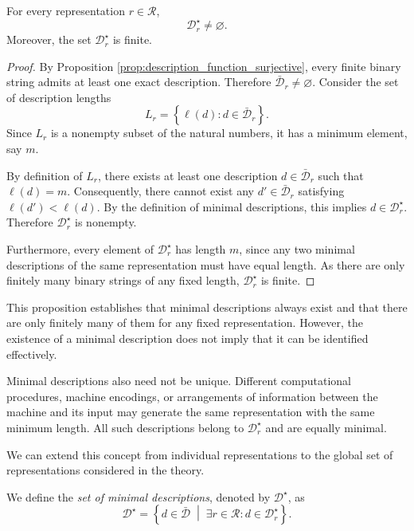 \begin{proposition}
\label{prop:minimal_descriptions_exist}
For every representation $r\in\mathcal{R}$,
\[
\mathcal{D}_r^\star\neq\varnothing.
\]
Moreover, the set $\mathcal{D}_r^\star$ is finite.
\end{proposition}
\begin{proof}
By Proposition \ref{prop:description_function_surjective}, every finite binary string admits at least one exact description. Therefore $\bar{\mathcal{D}}_r\neq\varnothing$. Consider the set of description lengths
\[
L_r = \left\{\ell(d):d\in\bar{\mathcal{D}}_r\right\}.
\]
Since $L_r$ is a nonempty subset of the natural numbers, it has a minimum element, say $m$.

By definition of $L_r$, there exists at least one description $d\in\bar{\mathcal{D}}_r$ such that $\ell(d)=m$. Consequently, there cannot exist any $d'\in\bar{\mathcal{D}}_r$ satisfying $\ell(d')<\ell(d)$. By the definition of minimal descriptions, this implies $d\in\mathcal{D}_r^\star$. Therefore $\mathcal{D}_r^\star$ is nonempty.

Furthermore, every element of $\mathcal{D}_r^\star$ has length $m$, since any two minimal descriptions of the same representation must have equal length. As there are only finitely many binary strings of any fixed length, $\mathcal{D}_r^\star$ is finite.
\end{proof}

This proposition establishes that minimal descriptions always exist and that there are only finitely many of them for any fixed representation. However, the existence of a minimal description does not imply that it can be identified effectively.

Minimal descriptions also need not be unique. Different computational procedures, machine encodings, or arrangements of information between the machine and its input may generate the same representation with the same minimum length. All such descriptions belong to $\mathcal{D}_r^\star$ and are equally minimal.

We can extend this concept from individual representations to the global set of representations considered in the theory.

\begin{definition}
\label{def:set_of_minimal_descriptions}
We define the \emph{set of minimal descriptions}, denoted by $\mathcal{D}^\star$, as
\[
\mathcal{D}^\star = \left\{d\in\bar{\mathcal{D}} \;\middle|\; \exists r\in\mathcal{R}: d\in\mathcal{D}_r^\star \right\}.
\]
\end{definition}

